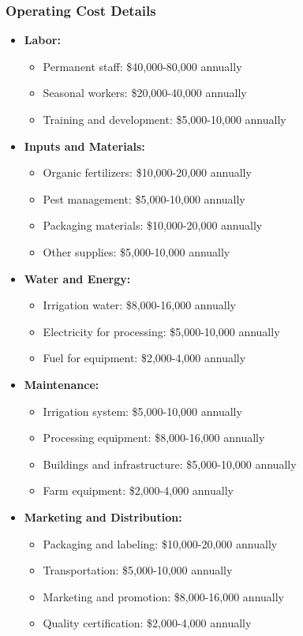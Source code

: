 \subsubsection{Operating Cost Details}
\begin{itemize}
    \item \textbf{Labor:}
    \begin{itemize}
        \item Permanent staff: \$40,000-80,000 annually
        \item Seasonal workers: \$20,000-40,000 annually
        \item Training and development: \$5,000-10,000 annually
    \end{itemize}
    
    \item \textbf{Inputs and Materials:}
    \begin{itemize}
        \item Organic fertilizers: \$10,000-20,000 annually
        \item Pest management: \$5,000-10,000 annually
        \item Packaging materials: \$10,000-20,000 annually
        \item Other supplies: \$5,000-10,000 annually
    \end{itemize}
    
    \item \textbf{Water and Energy:}
    \begin{itemize}
        \item Irrigation water: \$8,000-16,000 annually
        \item Electricity for processing: \$5,000-10,000 annually
        \item Fuel for equipment: \$2,000-4,000 annually
    \end{itemize}
    
    \item \textbf{Maintenance:}
    \begin{itemize}
        \item Irrigation system: \$5,000-10,000 annually
        \item Processing equipment: \$8,000-16,000 annually
        \item Buildings and infrastructure: \$5,000-10,000 annually
        \item Farm equipment: \$2,000-4,000 annually
    \end{itemize}
    
    \item \textbf{Marketing and Distribution:}
    \begin{itemize}
        \item Packaging and labeling: \$10,000-20,000 annually
        \item Transportation: \$5,000-10,000 annually
        \item Marketing and promotion: \$8,000-16,000 annually
        \item Quality certification: \$2,000-4,000 annually
    \end{itemize}
\end{itemize}

